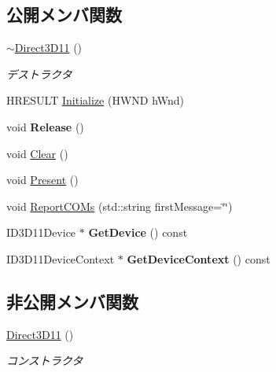 \subsection*{公開メンバ関数}
\begin{DoxyCompactItemize}
\item 
\hyperlink{class_d3_d11_1_1_direct3_d11_a99102e32e8ba1004955d94885322776b}{$\sim$\+Direct3\+D11} ()\hypertarget{class_d3_d11_1_1_direct3_d11_a99102e32e8ba1004955d94885322776b}{}\label{class_d3_d11_1_1_direct3_d11_a99102e32e8ba1004955d94885322776b}

\begin{DoxyCompactList}\small\item\em デストラクタ \end{DoxyCompactList}\item 
H\+R\+E\+S\+U\+LT \hyperlink{class_d3_d11_1_1_direct3_d11_a9567d2e7c0ccc19e447154f25335e006}{Initialize} (H\+W\+ND h\+Wnd)
\item 
void {\bfseries Release} ()\hypertarget{class_d3_d11_1_1_direct3_d11_a94c93747c8daa99d65c2a04c6be0748c}{}\label{class_d3_d11_1_1_direct3_d11_a94c93747c8daa99d65c2a04c6be0748c}

\item 
void \hyperlink{class_d3_d11_1_1_direct3_d11_aa71d36872f416feaa853788a7a7a7ef8}{Clear} ()
\item 
void \hyperlink{class_d3_d11_1_1_direct3_d11_a9b05a17ef5246aa3edb781748d58fd2b}{Present} ()
\item 
void \hyperlink{class_d3_d11_1_1_direct3_d11_a630f2a359e353bf01f907f1ed0efc3e4}{Report\+C\+O\+Ms} (std\+::string first\+Message=\char`\"{}\char`\"{})
\item 
I\+D3\+D11\+Device $\ast$ {\bfseries Get\+Device} () const \hypertarget{class_d3_d11_1_1_direct3_d11_a2d29a54e96836ca83181418a4d55ec28}{}\label{class_d3_d11_1_1_direct3_d11_a2d29a54e96836ca83181418a4d55ec28}

\item 
I\+D3\+D11\+Device\+Context $\ast$ {\bfseries Get\+Device\+Context} () const \hypertarget{class_d3_d11_1_1_direct3_d11_a7c867cc4d7cb092b0c17eb44704e2221}{}\label{class_d3_d11_1_1_direct3_d11_a7c867cc4d7cb092b0c17eb44704e2221}

\end{DoxyCompactItemize}
\subsection*{非公開メンバ関数}
\begin{DoxyCompactItemize}
\item 
\hyperlink{class_d3_d11_1_1_direct3_d11_aefd83bcdc7237ec876a4d4800d4e4707}{Direct3\+D11} ()\hypertarget{class_d3_d11_1_1_direct3_d11_aefd83bcdc7237ec876a4d4800d4e4707}{}\label{class_d3_d11_1_1_direct3_d11_aefd83bcdc7237ec876a4d4800d4e4707}

\begin{DoxyCompactList}\small\item\em コンストラクタ \end{DoxyCompactList}\end{DoxyCompactItemize}
